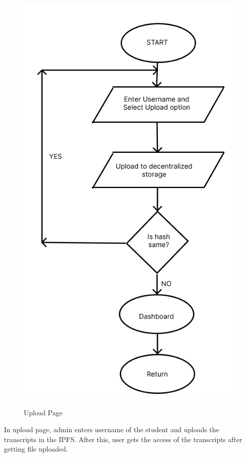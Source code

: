 \begin{figure}[H]
    \centering
    \includegraphics[scale=0.4]{images/upload_flowchart.png}\\[0.5cm]
    \caption{Upload Page}
    \label{fig:my_label}
\end{figure}

\noindent
In upload page, admin enters username of the student and uploads the transcripts in the IPFS. After this, user gets the access of the transcripts after getting file uploaded.

